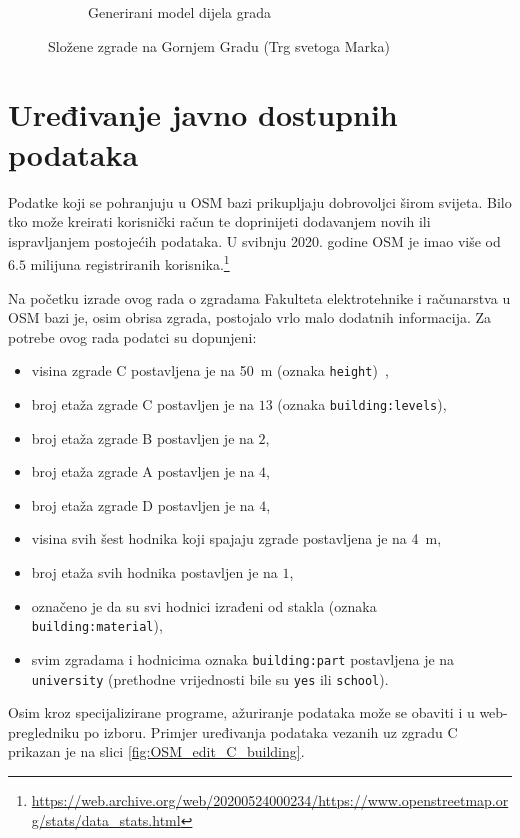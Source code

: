 \documentclass[times, utf8, zavrsni, numeric]{fer}
\begin{document}
\begin{figure}[h]
\begin{subfigure}{.5\textwidth}
				\caption{Generirani model dijela grada}
				\label{fig:relations_upper_town_render}
			\end{subfigure}
			\caption{Složene zgrade na Gornjem Gradu (Trg svetoga Marka)}
			\label{fig:relations_upper_town}
		\end{figure}
	
	
	
	\section{Uređivanje javno dostupnih podataka}
	
		Podatke koji se pohranjuju u OSM bazi prikupljaju dobrovoljci širom svijeta.
		Bilo tko može kreirati korisnički račun te doprinijeti dodavanjem novih ili ispravljanjem postojećih podataka.
		U svibnju 2020. godine OSM je imao više od $6.5$ milijuna registriranih korisnika.\footnote{\url{https://web.archive.org/web/20200524000234/https://www.openstreetmap.org/stats/data_stats.html}}
		
		Na početku izrade ovog rada o zgradama Fakulteta elektrotehnike i računarstva u OSM bazi je, osim obrisa zgrada, postojalo vrlo malo dodatnih informacija.
		Za potrebe ovog rada podatci su dopunjeni:
		
		\begin{itemize}
			\item visina zgrade C postavljena je na \SI{50}{\meter} (oznaka \texttt{height})~\cite{wiki:zagrebneboderi},
			\item broj etaža zgrade C postavljen je na $13$ (oznaka \texttt{building:levels}),
			\item broj etaža zgrade B postavljen je na $2$,
			\item broj etaža zgrade A postavljen je na $4$,
			\item broj etaža zgrade D postavljen je na $4$,
			\item visina svih šest hodnika koji spajaju zgrade postavljena je na \SI{4}{\meter},
			\item broj etaža svih hodnika postavljen je na $1$,
			\item označeno je da su svi hodnici izrađeni od stakla (oznaka \texttt{building:material}),
			\item svim zgradama i hodnicima oznaka \texttt{building:part} postavljena je na \texttt{university} (prethodne vrijednosti bile su \texttt{yes} ili \texttt{school}).
		\end{itemize}
		
		Osim kroz specijalizirane programe, ažuriranje podataka može se obaviti i u web-pregledniku po izboru.
		Primjer uređivanja podataka vezanih uz zgradu C prikazan je na slici \ref{fig:OSM_edit_C_building}.
		
\end{document}
